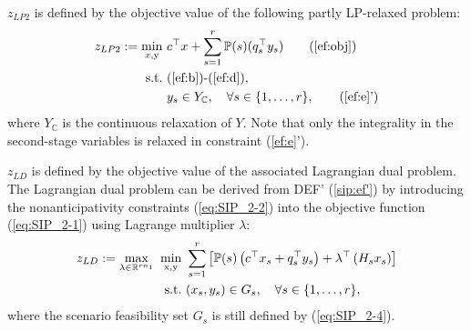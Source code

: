 %

$z_{LP2}$ is defined by the objective value of the following partly LP-relaxed problem:
\begin{subequations}\label{ef-lp2}
	\begin{align}
	z_{LP2}:=\min_{x,\mathrm{y}}\ & c^{\top}x + \sum_{s=1}^{r}\PP(s) (q_s^{\top}y_s) \tag{\ref{ef:obj}}\\ 
	\mathrm{s.t.}\ &\textrm{(\ref{ef:b})-(\ref{ef:d})}, \nonumber \\
	& y_s\in Y_\mathbb{C} ,\quad\forall s\in\{1,\ldots,r\}, \tag{\ref{ef:e}'}
	\end{align}
\end{subequations}
where $Y_\mathbb{C}$ is the continuous relaxation of $Y$.
Note that only the integrality in the second-stage variables is relaxed in constraint (\ref{ef:e}').

$z_{LD}$ is defined by the objective value of the associated Lagrangian dual problem. The Lagrangian dual problem can be derived from DEF' (\ref{sip:ef'}) by introducing the nonanticipativity constraints (\ref{eq:SIP_2-2}) into the objective function (\ref{eq:SIP_2-1}) using Lagrange multiplier $\lambda$:
\begin{subequations}\label{ld}
	\begin{align}
	z_{LD}:=\max_{\lambda\in\mathbb{R}^{rn_1}}\ \min_{\mathrm{x},\mathrm{y}}\   &\sum_{s=1}^{r}\left[\operatorname*{\mathbb{P}}(s)\left(c^{\top}x_s+q_s^{\top}y_s\right)+\lambda^\top \left(H_s x_s\right)\right] \label{ld:obj}\\ 
	\mathrm{s.t.}\ & (x_s,y_s)\in G_s,\quad \forall s\in\{1,\ldots,r\},	 \label{ld:b}
	\end{align}
\end{subequations}
where the scenario feasibility set $G_s$ is still defined by (\ref{eq:SIP_2-4}).

